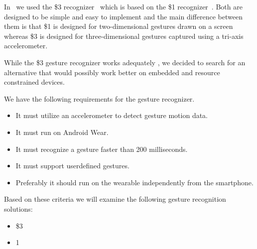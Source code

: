 In~\cite{prespecialisation} we used the \$3 recognizer~\cite{threedollar} which is based on the \$1 recognizer~\cite{wobbrock2007gestures}.
Both are designed to be simple and easy to implement and the main difference between them is that \$1 is designed for two-dimensional gestures drawn on a screen whereas \$3 is designed for three-dimensional gestures captured using a tri-axis accelerometer.

While the \$3 gesture recognizer works adequately \cite[p. 55]{prespecialisation}, we decided to search for an alternative that would possibly work better on embedded and resource constrained devices.

We have the following requirements for the gesture recognizer.

\begin{itemize}
    \item It must utilize an accelerometer to detect gesture motion data.
    \item It must run on Android Wear.
    \item It must recognize a gesture faster than 200 milliseconds.
    \item It must support userdefined gestures.
    \item Preferably it should run on the wearable independently from the smartphone.
\end{itemize}

Based on these criteria we will examine the following gesture recognition solutions:

\begin{itemize}
    \item \$3~\cite{threedollar}
    \item 1\textcent~\cite{herold20121}
\end{itemize}



